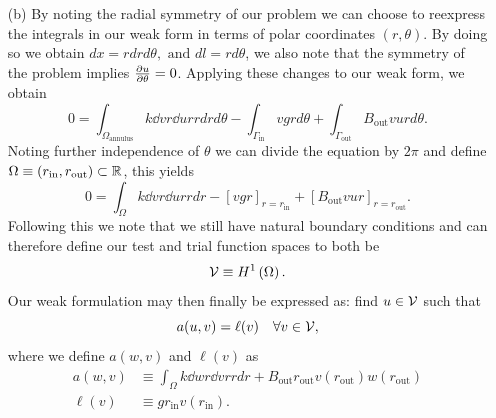 \documentclass{article}
\begin{document}
\begin{itemize}
	\item[(b)] By noting the radial symmetry of our problem we can choose to reexpress the integrals in our weak form in terms of polar coordinates \(\left(r,\theta\right) \). By doing so we obtain \(dx = rdrd\theta, \text{ and }dl = rd\theta \), we also note that the symmetry of the problem implies \(\frac{\partial u}{\partial \theta} = 0 \). Applying these changes to our weak form, we obtain 
	\begin{equation}
		0 = \int_{\Omega_\text{annulus}} k\dd{v}{r}\dd{u}{r} rdrd\theta - \int_{\Gamma_\text{in}} vg rd\theta + \int_{\Gamma_\text{out}} B_\text{out}vu rd\theta. 
	\end{equation}
	Noting further independence of \(\theta\) we can divide the equation by \(2\pi\) and define \(\Omega \equiv \left(r_\text{in},r_\text{out} \right) \subset \mathbb{R} \), this yields
	\begin{equation}
		0 = \int_{\Omega} k\dd{v}{r}\dd{u}{r} rdr -  \left[vgr\right]_{r = r_\text{in}} + \left[B_\text{out}vur \right]_{r=r_\text{out}}. 
	\end{equation}
	Following this we note that we still have natural boundary conditions and can therefore define our test and trial function spaces to both be
	\begin{equation}
		\mathcal{V} \equiv H^1\left(\Omega\right).
	\end{equation}
	Our weak formulation may then finally be expressed as: find \(u \in \mathcal{V} \) such that
	\begin{equation}
		a(u,v) = \ell(v) \quad \forall v \in \mathcal{V},
	\end{equation}
	where we define \(a(w,v)\) and \(\ell(v) \) as 
	\begin{align}
		a(w,v) &\equiv \int_{\Omega} k\dd{w}{r}\dd{v}{r} rdr + B_\text{out}r_\text{out}v(r_\text{out})w(r_\text{out}) \\ 
		\ell(v) &\equiv  gr_\text{in}v(r_\text{in}).
	\end{align}
	

\end{itemize}
\end{document}
